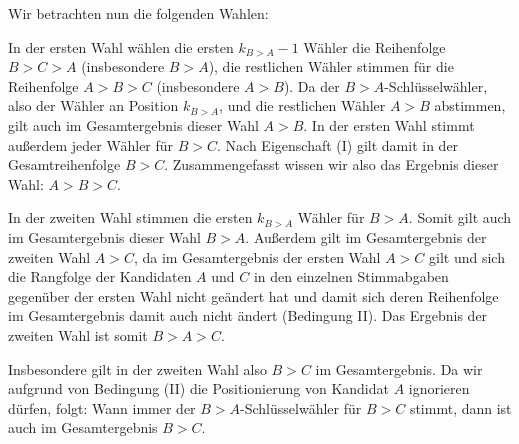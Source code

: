 \documentclass[a4paper,ngerman,12pt]{scrartcl}
\theoremstyle{definition}
\begin{document}
\begin{antw}
  Wir betrachten nun die folgenden Wahlen:

  \begin{center}
  \end{center}

  In der ersten Wahl wählen die ersten $k_{B>A}-1$ Wähler die Reihenfolge $B > C > A$ (insbesondere $B > A$), die restlichen Wähler stimmen für die Reihenfolge $A > B > C$ (insbesondere $A > B$). Da der $B>A$-Schlüsselwähler, also der Wähler an Position $k_{B>A}$, und die restlichen Wähler $A > B$ abstimmen, gilt auch im Gesamtergebnis dieser Wahl $A > B$. In der ersten Wahl stimmt außerdem jeder Wähler für $B > C$. Nach Eigenschaft (I) gilt damit in der Gesamtreihenfolge $B > C$. Zusammengefasst wissen wir also das Ergebnis dieser Wahl: $A > B > C$.

  In der zweiten Wahl stimmen die ersten $k_{B>A}$ Wähler für $B > A$. Somit gilt auch im Gesamtergebnis dieser Wahl $B > A$. Außerdem gilt im Gesamtergebnis der zweiten Wahl $A > C$, da im Gesamtergebnis der ersten Wahl $A > C$ gilt und sich die Rangfolge der Kandidaten $A$ und $C$ in den einzelnen Stimmabgaben gegenüber der ersten Wahl nicht geändert hat und damit sich deren Reihenfolge im Gesamtergebnis damit auch nicht ändert (Bedingung II). Das Ergebnis der zweiten Wahl ist somit $B > A > C$.

  Insbesondere gilt in der zweiten Wahl also $B > C$ im Gesamtergebnis. Da wir aufgrund von Bedingung (II) die Positionierung von Kandidat $A$ ignorieren dürfen, folgt: Wann immer der $B{>}A$-Schlüsselwähler für $B > C$ stimmt, dann ist auch im Gesamtergebnis $B > C$.


\end{antw}
\end{document}
